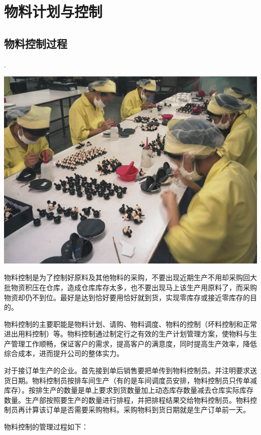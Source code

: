 \section {物料计划与控制}

\subsection {物料控制过程}
.
    \begin{center}
        \includegraphics[scale=0.5]{pline1.jpg}
    \end{center}

    物料控制是为了控制好原料及其他物料的采购，不要出现近期生产不用却采购回大批物资积压在仓库，造成仓库库存太多，也不要出现马上该生产用原料了，而采购物资却仍不到位。最好是达到恰好要用恰好就到货，实现零库存或接近零库存的目的。

    物料控制的主要职能是物料计划、请购、物料调度、物料的控制（坏料控制和正常进出用料控制）等。物料控制通过制定行之有效的生产计划管理方案，使物料与生产管理工作顺畅，保证客户的需求，提高客户的满意度，同时提高生产效率，降低综合成本，进而提升公司的整体实力。

    对于接订单生产的企业。首先接到单后销售要把单传到物料控制员。并注明要求送货日期。物料控制员按排车间生产（有的是车间调度员安排，物料控制员只传单减库存）。按排生产的数量是单上要求到货数量加上动态库存数量减去仓库实际库存数量。生产部按照要生产的数量进行排程，并把排程结果交给物料控制员。物料控制员再计算该订单是否需要采购物料。采购物料到货日期就是生产订单前一天。

    物料控制的管理过程如下：

